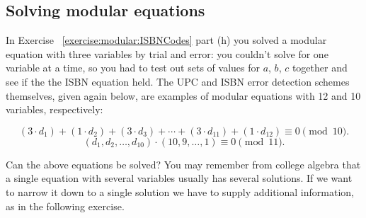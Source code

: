 


\subsection{Solving modular equations}

In Exercise ~\ref{exercise:modular:ISBNCodes} part (h) you solved a modular equation with three variables by trial and error: you couldn't solve for one variable at a time, so you had to test out sets of values for $a$, $b$, $c$ together and see if the the ISBN equation held.  The UPC and ISBN error detection schemes themselves, given again below,  are examples of modular equations with 12 and 10 variables, respectively: 

\[
(3 \cdot d_1) + (1 \cdot d_2) + (3 \cdot d_3) + \cdots + (3 \cdot
d_{11}) + (1 \cdot d_{12}) \equiv 0 \pmod{10}.
\]
\[
(d_1, d_2, \ldots, d_{10} ) \cdot (10, 9, \ldots, 1 )  \equiv 0 \pmod{11}.
\] 

Can the above equations be solved?  You may remember from college algebra that a single equation with several variables usually has several solutions. If we want to narrow it down to a single solution we have to supply additional information, as in the following exercise.  


